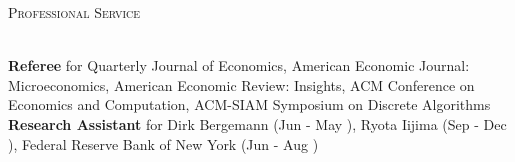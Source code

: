 \documentclass[letterpaper,11pt]{article}
\newcommand{\lineunder} {
    \vspace*{-4pt} \\
	\hrulefill \\
	\vspace{-2pt}
}
\newcommand{\header} [1] {
    {\vspace*{6pt} \large{\textsc{#1}}}
    \vspace*{-6pt} \lineunder
}
\begin{document}
\vspace{3mm}


\header{Professional Service}

\textbf{Referee} for Quarterly Journal of Economics, American Economic Journal: Microeconomics, American Economic Review: Insights, ACM Conference on Economics and Computation, ACM-SIAM Symposium on Discrete Algorithms \\[1.5mm]

\textbf{Research Assistant} for Dirk Bergemann (Jun  - May ), Ryota Iijima (Sep  - Dec ), Federal Reserve Bank of New York (Jun  - Aug )
\end{document}
